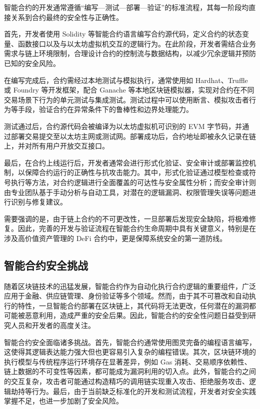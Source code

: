 \documentclass[print, master, vlined, timesmath]{DissertUESTC}
\begin{document}
智能合约的开发通常遵循“编写—测试—部署—验证”的标准流程，其每一阶段均直接关系到合约最终的安全性与正确性。

首先，开发者使用 Solidity 等智能合约语言编写合约源代码，定义合约的状态变量、函数接口以及与以太坊虚拟机交互的逻辑行为。在此阶段，开发者需结合业务需求与链上环境限制，合理设计合约的控制流与数据结构，以减少冗余逻辑并预防已知的安全风险。

在编写完成后，合约需经过本地测试与模拟执行，通常使用如 Hardhat、Truffle 或 Foundry 等开发框架，配合 Ganache 等本地区块链模拟器，实现对合约在不同交易场景下行为的单元测试与集成测试。测试过程中可以使用断言、模拟攻击者行为等手段，验证合约在异常条件下的鲁棒性和边界处理能力。

测试通过后，合约源代码会被编译为以太坊虚拟机可识别的 EVM 字节码，并通过部署交易提交至以太坊主网或测试网。部署成功后，合约地址即被永久记录在链上，并对所有用户开放交互接口。

最后，在合约上线运行后，开发者通常会进行形式化验证、安全审计或部署监控机制，以保障合约运行的正确性与抗攻击能力。其中，形式化验证通过模型检查或符号执行等方法，对合约逻辑进行全面覆盖的可达性与安全属性分析；而安全审计则由专业团队基于手动分析与自动工具，对潜在的逻辑漏洞、权限管理失误等问题进行识别与修复建议。

需要强调的是，由于链上合约的不可更改性，一旦部署后发现安全缺陷，将极难修复。因此，完善的开发与验证流程在智能合约生命周期中具有关键意义，特别是在涉及高价值资产管理的 DeFi 合约中，更是保障系统安全的第一道防线。

\subsection{智能合约安全挑战}

随着区块链技术的迅猛发展，智能合约作为自动化执行合约逻辑的重要组件，广泛应用于金融、供应链管理、身份验证等多个领域。然而，由于其不可篡改和自动执行的特性，一旦智能合约部署在区块链上，其代码将无法更改，任何潜在的漏洞都可能被恶意利用，造成严重的安全后果。因此，智能合约的安全性问题日益受到研究人员和开发者的高度关注。

智能合约安全面临诸多挑战。首先，智能合约通常使用图灵完备的编程语言编写，这使得其逻辑表达能力强大但也更容易引入复杂的编程错误。其次，区块链环境的执行模型与传统程序运行环境存在显著差异，例如 Gas 消耗、交易顺序依赖性、链上数据的不可变性等因素，都可能成为漏洞利用的切入点。此外，智能合约之间的交互复杂，攻击者可能通过构造精巧的调用链实现重入攻击、拒绝服务攻击、逻辑劫持等行为。最后，由于当前缺乏标准化的开发和测试流程，开发者对安全实践掌握不足，也进一步加剧了安全风险。
\end{document}
